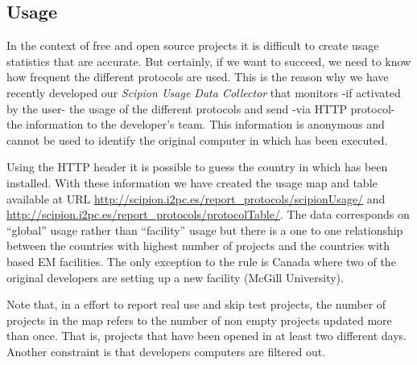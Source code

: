 \subsection{Usage}
In the context of free and open source projects it is difficult to create usage statistics that are accurate. But certainly, if we want \scipion to succeed, we need to 
know how frequent the different protocols are used. This is the reason why we have recently developed our \textit{Scipion Usage Data Collector} that monitors -if activated by the user- the usage of the different protocols and send -via HTTP protocol- the information to the developer's team. This information is anonymous and cannot be used to identify the original computer in which \scipion has been executed. 

Using the HTTP header it is possible to guess the country in which \scipion has been installed. With these information we have created the usage map and table available at URL \url{http://scipion.i2pc.es/report_protocols/scipionUsage/} and  \url{http://scipion.i2pc.es/report_protocols/protocolTable/}. The data corresponds on ``global'' \scipion usage rather than ``facility'' usage but there 
is a one to one relationship between the  countries with highest number of \scipion projects and the countries with \scipion based EM facilities. The only exception to the rule is Canada where two of the original \scipion developers are setting up a new facility (McGill University).

Note that, in a effort to report real use and skip test projects, the number of projects in the map refers to the number of non empty \scipion projects updated more than once. That is, 
\scipion projects that have been opened in at least two different days. Another constraint is that developers computers are filtered out.

